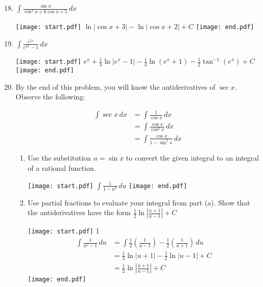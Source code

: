 \documentclass[12pt]{article}
\begin{document}

\begin{enumerate}
\setcounter{enumi}{17}

\item $\int \frac{\sin{x}}{\cos^2{x}+6\cos{x}+5} \,dx$

\texttt{[image: start.pdf]}
{{$\ln{|\cos{x}+3|}-\ln{|\cos{x}+2|}+C$}}
\texttt{[image: end.pdf]}


\item $\int \frac{e^{5x}}{e^{4x}-1} \,dx$

\texttt{[image: start.pdf]}
{{$e^{x}+\frac{1}{4}\ln|e^x-1|-\frac{1}{4}\ln(e^x+1)-\frac{1}{2}\tan^{-1}(e^x)+C$}}
\texttt{[image: end.pdf]}


\newpage

\item By the end of this problem, you will know the antiderivatives of $\sec{x}$.  Observe the following:
\begin{center}
\begin{align*}
\int \sec{x} \,dx &= \int \frac{1}{\cos{x}} \,dx\\
&= \int \frac{\cos{x}}{\cos^2{x}} \,dx\\
&= \int \frac{\cos{x}}{1-\sin^2{x}} \,dx
\end{align*}
\end{center}
\begin{enumerate}

\item Use the substitution $u=\sin{x}$ to convert the given integral to an integral of a rational function.  

\texttt{[image: start.pdf]}
{{$\int \frac{1}{1-u^2} \,du$}}
\texttt{[image: end.pdf]}


\item Use partial fractions to evaluate your integral from part (a).  Show that the antiderivatives have the form $\frac{1}{2}\ln{\left|\frac{u+1}{u-1}\right|}+C$

\texttt{[image: start.pdf]}
{{{1\linewidth}{
\begin{align*}
\int \frac{1}{u^2-1}\,du &= \int \frac{1}{2}\left(\frac{1}{u-1}\right)-\frac{1}{2}\left(\frac{1}{u+1}\right) \,du\\
&=\frac{1}{2}\ln{|u+1|}-\frac{1}{2}\ln{|u-1|}+C\\
&=\frac{1}{2}\ln{\left|\frac{u+1}{u-1}\right|}+C
\end{align*}
}}}
\texttt{[image: end.pdf]}



\end{enumerate}
\end{enumerate}
\end{document}
